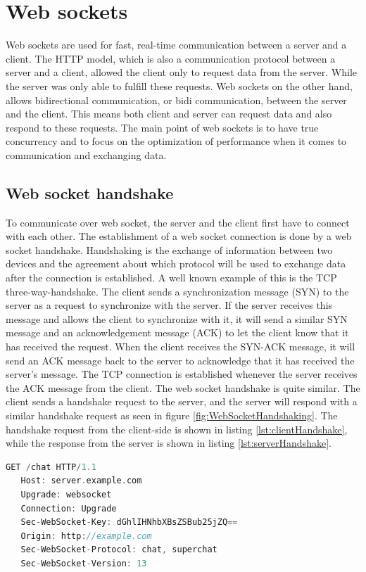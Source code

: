 \documentclass[a4paper, 11pt]{report}
\begin{document}
\section{Web sockets}
Web sockets are used for fast, real-time communication between a server and a client. The HTTP model, which is also a communication protocol between a server and a client, allowed the client only to request data from the server. While the server was only able to fulfill these requests. Web sockets on the other hand, allows bidirectional communication, or bidi communication, between the server and the client. This means both client and server can request data and also respond to these requests. The main point of web sockets is to have true concurrency and to focus on the optimization of performance when it comes to communication and exchanging data.

	\subsection{Web socket handshake}
To communicate over web socket, the server and the client first have to connect with each other. The establishment of a web socket connection is done by a web socket handshake. Handshaking is the exchange of information between two devices and the agreement about which protocol will be used to exchange data after the connection is established. A well known example of this is the TCP three-way-handshake. The client sends a synchronization message (SYN) to the server as a request to synchronize with the server. If the server receives this message and allows the client to synchronize with it, it will send a similar SYN message and an acknowledgement message (ACK) to let the client know that it has received the request. When the client receives the SYN-ACK message, it will send an ACK message back to the server to acknowledge that it has received the server's message. The TCP connection is established whenever the server receives the ACK message from the client.
The web socket handshake is quite similar. The client sends a handshake request to the server, and the server will respond with a similar handshake request as seen in figure \ref{fig:WebSocketHandshaking}. The handshake request from the client-side is shown in listing \ref{lst:clientHandshake}, while the response from the server is shown in listing \ref{lst:serverHandshake}.
\begin{lstlisting}[caption={Client's request for websocket handshake},captionpos=b, label={lst:clientHandshake}, language=c, float=h]
   GET /chat HTTP/1.1
   Host: server.example.com
   Upgrade: websocket
   Connection: Upgrade
   Sec-WebSocket-Key: dGhlIHNhbXBsZSBub25jZQ==
   Origin: http://example.com
   Sec-WebSocket-Protocol: chat, superchat
   Sec-WebSocket-Version: 13
\end{lstlisting}
\end{document}
